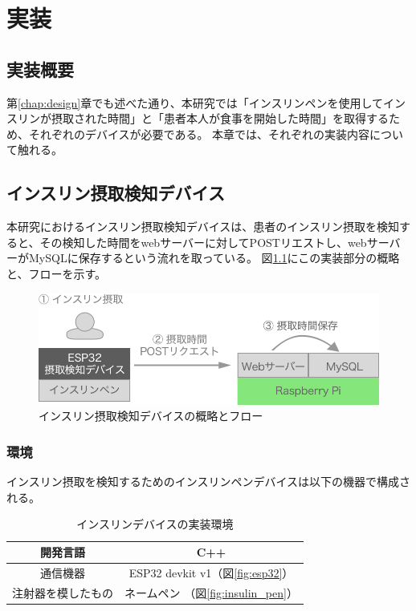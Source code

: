 \chapter{実装}
\label{chap:implementation}

\section{実装概要}

第\ref{chap:design}章でも述べた通り、本研究では「インスリンペンを使用してインスリンが摂取された時間」と「患者本人が食事を開始した時間」を取得するため、それぞれのデバイスが必要である。
本章では、それぞれの実装内容について触れる。

\section{インスリン摂取検知デバイス}
\label{section:insulin_pen_device}

本研究におけるインスリン摂取検知デバイスは、患者のインスリン摂取を検知すると、その検知した時間をwebサーバーに対してPOSTリエストし、webサーバーがMySQLに保存するという流れを取っている。
図\ref{fig:insulin_injection_flow}にこの実装部分の概略と、フローを示す。

\begin{figure}[htbp]
  \caption{インスリン摂取検知デバイスの概略とフロー}
  \label{fig:insulin_injection_flow}
  \begin{center}
    \includegraphics[bb=0 0 1000 270,width=18cm]{assets/insulin_injection_flow.png}
  \end{center}
\end{figure}

\subsection{環境}

インスリン摂取を検知するためのインスリンペンデバイスは以下の機器で構成される。

\begin{table}[htbp]
  \caption{インスリンデバイスの実装環境}
  \label{tb:insulin-device}
  \begin{center}
    \begin{tabular}{|c||c|}
      \hline
      開発言語  & C++ \\\hline
      通信機器  & ESP32 devkit v1（図\ref{fig:esp32}） \\\hline
      注射器を模したもの & ネームペン （図\ref{fig:insulin_pen}）\\\hline
    \end{tabular}
  \end{center}
\end{table}

